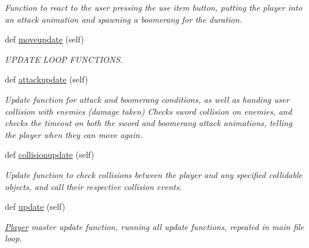 \begin{DoxyCompactItemize}
\begin{DoxyCompactList}\small\item\em Function to react to the user pressing the use item button, putting the player into an attack animation and spawning a boomerang for the duration. \end{DoxyCompactList}\item 
def \hyperlink{classactor_1_1player_1_1_player_a709570fc745642d3ad2764e4d973491b}{moveupdate} (self)
\begin{DoxyCompactList}\small\item\em U\+P\+D\+A\+TE L\+O\+OP F\+U\+N\+C\+T\+I\+O\+NS. \end{DoxyCompactList}\item 
def \hyperlink{classactor_1_1player_1_1_player_ab05b71626b99e6cb0babce2d9f7bbb49}{attackupdate} (self)
\begin{DoxyCompactList}\small\item\em Update function for attack and boomerang conditions, as well as handing user collision with enemies (damage taken)  Checks sword collision on enemies, and checks the timeout on both the sword and boomerang attack animations, telling the player when they can move again. \end{DoxyCompactList}\item 
\mbox{\label{classactor_1_1player_1_1_player_a427c65b6cb4d5b960493ead3cfc3fda1}} 
def \hyperlink{classactor_1_1player_1_1_player_a427c65b6cb4d5b960493ead3cfc3fda1}{collisionupdate} (self)
\begin{DoxyCompactList}\small\item\em Update function to check collisions between the player and any specified collidable objects, and call their respective collision events. \end{DoxyCompactList}\item 
\mbox{\label{classactor_1_1player_1_1_player_a20c476e0a1df612e3560916b9beda6ef}} 
def \hyperlink{classactor_1_1player_1_1_player_a20c476e0a1df612e3560916b9beda6ef}{update} (self)
\begin{DoxyCompactList}\small\item\em \hyperlink{classactor_1_1player_1_1_player}{Player} master update function, running all update functions, repeated in main file loop. \end{DoxyCompactList}\end{DoxyCompactItemize}
